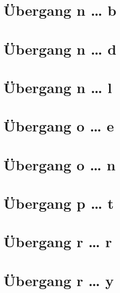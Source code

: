 \documentclass[a4paper,landscape]{article}
\begin{document}
\hspace*{-1ex}
\newpage

\section{Übergang n … b }

\hspace*{-1ex}
\newpage

\section{Übergang n … d }

\hspace*{-1ex}
\newpage

\section{Übergang n … l }

\hspace*{-1ex}
\newpage

\section{Übergang o … e }

\hspace*{-1ex}
\newpage

\section{Übergang o … n }

\hspace*{-1ex}
\newpage

\section{Übergang p … t }

\hspace*{-1ex}
\newpage

\section{Übergang r … r }

\hspace*{-1ex}
\newpage

\section{Übergang r … y }
\end{document}
